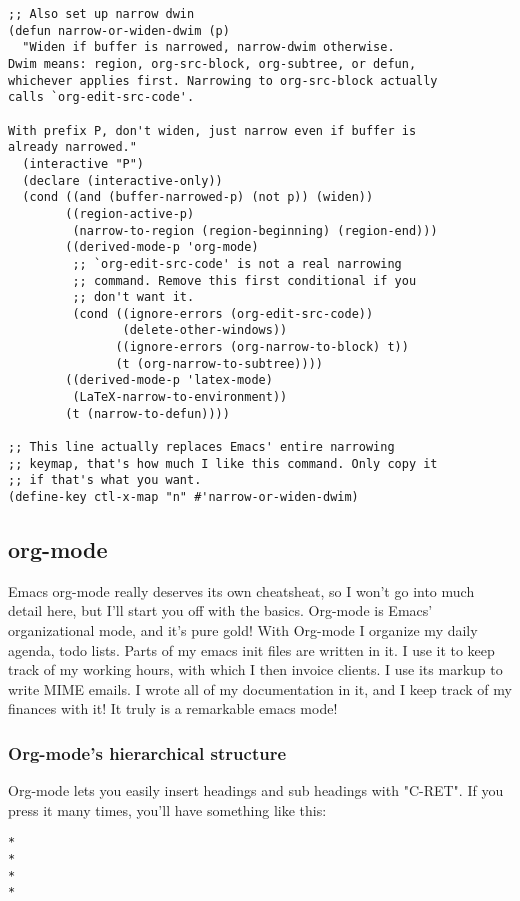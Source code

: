 \documentclass[11pt]{article}
\begin{document}
\begin{verbatim}
;; Also set up narrow dwin
(defun narrow-or-widen-dwim (p)
  "Widen if buffer is narrowed, narrow-dwim otherwise.
Dwim means: region, org-src-block, org-subtree, or defun,
whichever applies first. Narrowing to org-src-block actually
calls `org-edit-src-code'.

With prefix P, don't widen, just narrow even if buffer is
already narrowed."
  (interactive "P")
  (declare (interactive-only))
  (cond ((and (buffer-narrowed-p) (not p)) (widen))
        ((region-active-p)
         (narrow-to-region (region-beginning) (region-end)))
        ((derived-mode-p 'org-mode)
         ;; `org-edit-src-code' is not a real narrowing
         ;; command. Remove this first conditional if you
         ;; don't want it.
         (cond ((ignore-errors (org-edit-src-code))
                (delete-other-windows))
               ((ignore-errors (org-narrow-to-block) t))
               (t (org-narrow-to-subtree))))
        ((derived-mode-p 'latex-mode)
         (LaTeX-narrow-to-environment))
        (t (narrow-to-defun))))

;; This line actually replaces Emacs' entire narrowing
;; keymap, that's how much I like this command. Only copy it
;; if that's what you want.
(define-key ctl-x-map "n" #'narrow-or-widen-dwim)
\end{verbatim}
\subsection{org-mode}
\label{sec:orgheadline18}
Emacs org-mode really deserves its own cheatsheat, so I won't go into much detail here, but I'll start you off with the basics.  Org-mode is Emacs' organizational mode, and it's pure gold!  With Org-mode I organize my daily agenda, todo lists. Parts of my emacs init files are written in it.  I use it to keep track of my working hours, with which I then invoice clients.  I use its markup to write MIME emails.  I wrote all of my documentation in it, and I keep track of my finances with it!  It truly is a remarkable emacs mode!
\subsubsection{Org-mode's hierarchical structure}
\label{sec:orgheadline15}
Org-mode lets you easily insert headings and sub headings with "C-RET".  If you press it many times, you'll have something like this:

\begin{verbatim}
*
*
*
*
\end{verbatim}
\end{document}
